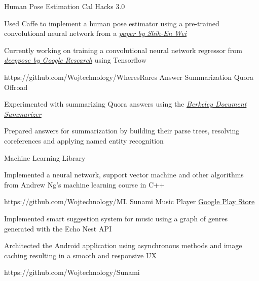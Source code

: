 \begin{cvprojects}
  \cvproject
    {Human Pose Estimation}
    {Cal Hacks 3.0}
    {
      \begin{cvitems}
      \item Used Caffe to implement a human pose estimator using a pre-trained convolutional neural network from a \textit{\href{https://arxiv.org/abs/1602.00134}{paper by Shih-En Wei}}
      \item Currently working on training a convolutional neural network regressor from \textit{\href{http://static.googleusercontent.com/media/research.google.com/ja//pubs/archive/42237.pdf}{deeppose by Google Research}} using Tensorflow
      \end{cvitems}
    }
    {https://github.com/Wojtechnology/WheresRares}
  \cvproject
    {Answer Summarization}
    {Quora Offroad}
    {
      \begin{cvitems}
      \item Experimented with summarizing Quora answers using the \textit{\href{https://github.com/gregdurrett/berkeley-doc-summarizer}{Berkeley Document Summarizer}}
      \item Prepared answers for summarization by building their parse trees, resolving coreferences and applying named entity recognition
      \end{cvitems}
    }
    {}
  \cvproject
    {Machine Learning Library}
    {}
    {
      \begin{cvitems}
      \item Implemented a neural network, support vector machine and other algorithms from Andrew Ng's machine learning course in C++
     \end{cvitems}
    }
    {https://github.com/Wojtechnology/ML}
  \cvproject
    {Sunami Music Player}
    {\href{http://play.google.com/store/apps/details?id=com.wojtechnology.sunami}{Google Play Store}}
    {
      \begin{cvitems}
        \item Implemented smart suggestion system for music using a graph of genres generated with the Echo Nest API
        \item Architected the Android application using asynchronous methods and image caching resulting in a smooth and responsive UX
      \end{cvitems}
    }
    {https://github.com/Wojtechnology/Sunami}
\end{cvprojects}
